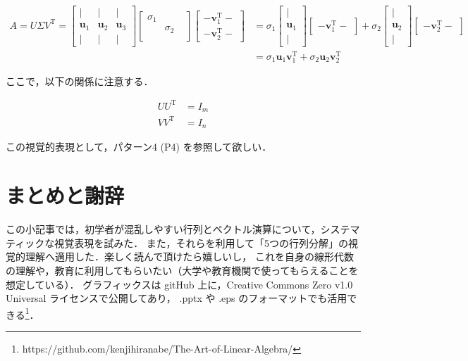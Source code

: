 \documentclass[letterpaper]{article}
\DeclareRobustCommand\transp{^{\mathrm{T}}}
\begin{document}
\begin{align*}
  A = U \Sigma V\transp =
  \begin{bmatrix}
    | & | & |\\
    \bm{u}_1 & \bm{u}_2 & \bm{u}_3\\
    | & | & |
  \end{bmatrix}
  \begin{bmatrix}
    \sigma_1 \\
           & \sigma_2 \\
           & &
  \end{bmatrix}
  \begin{bmatrix}
  - \bm{v}_1\transp -\\
  - \bm{v}_2\transp -
  \end{bmatrix}
  & =
  \sigma_1 \begin{bmatrix}
    |\\
    \bm{u}_1\\
    |
  \end{bmatrix}
  \begin{bmatrix}
    - \bm{v}_1\transp - 
  \end{bmatrix}
  +
  \sigma_2 \begin{bmatrix}
  |\\
  \bm{u}_2\\
  |
  \end{bmatrix}
  \begin{bmatrix}
  - \bm{v}_2\transp -
  \end{bmatrix} \\
& = \sigma_1 \bm{u}_1 \bm{v}_1\transp + \sigma_2 \bm{u}_2 \bm{v}_2\transp
\end{align*}

ここで，以下の関係に注意する．

\begin{align*}
  U U\transp &= I_m \\
  V V\transp &= I_n
\end{align*}

この視覚的表現として，パターン4 (P4) を参照して欲しい．

\section*{まとめと謝辞}

この小記事では，初学者が混乱しやすい行列とベクトル演算について，システマティックな視覚表現を試みた．
また，それらを利用して「5つの行列分解」の視覚的理解へ適用した．楽しく読んで頂けたら嬉しいし，
これを自身の線形代数の理解や，教育に利用してもらいたい（大学や教育機関で使ってもらえることを想定している）．
グラフィックスは gitHub 上に，Creative Commons Zero v1.0 Universal ライセンスで公開してあり，
.pptx や .eps のフォーマットでも活用できる\footnote{https://github.com/kenjihiranabe/The-Art-of-Linear-Algebra/}． 
\end{document}
